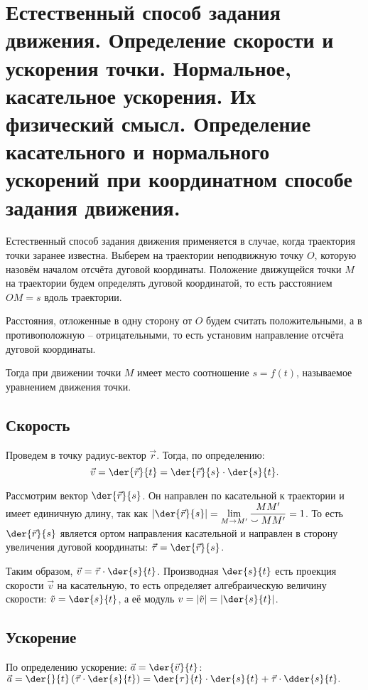 \chapter{Естественный способ задания движения. Определение скорости и ускорения
точки. Нормальное, касательное ускорения. Их физический смысл. Определение
касательного и нормального ускорений при координатном способе задания движения.}

Естественный способ задания движения применяется в случае, когда траектория
точки заранее известна. Выберем на траектории неподвижную точку \( O \), которую
назовём началом отсчёта дуговой координаты. Положение движущейся точки \( M \)
на траектории будем определять дуговой координатой, то есть расстоянием
\( OM = s \) вдоль траектории.

Расстояния, отложенные в одну сторону от \( O \) будем считать положительными, а
в противоположную -- отрицательными, то есть установим направление отсчёта
дуговой координаты.

Тогда при движении точки \( M \) имеет место соотношение \( s = f(t) \),
называемое уравнением движения точки.

\section{Скорость}

Проведем в точку радиус-вектор \( \vec{r} \). Тогда, по определению:
\[
    \vec{v} = \der{\vec{r}}{t} = \der{\vec{r}}{s}\cdot\der{s}{t}.
\]

Рассмотрим вектор \( \ds \der{\vec{r}}{s} \). Он направлен по касательной к
траектории и имеет единичную длину, так как \( \ds \left|\der{\vec{r}}{s}\right|
= \lim_{M\to M'}\frac{MM'}{\smallsmile MM'} = 1 \). То есть \( \ds
\der{\vec{r}}{s} \) является ортом направления касательной и направлен в сторону
увеличения дуговой координаты: \( \ds \vec{\tau} = \der{\vec{r}}{s} \).

Таким образом, \( \ds \vec{v} = \vec{\tau}\cdot\der{s}{t} \). Производная
\( \ds \der{s}{t} \) есть проекция скорости \( \vec{v} \) на касательную, то
есть определяет алгебраическую величину скорости: \( \ds \tilde{v} =
\der{s}{t} \), а её модуль \( \ds v = |\tilde{v}| = \left|\der{s}{t}\right| \).

\section{Ускорение}

По определению ускорение: \( \ds \vec{a} = \der{\vec{v}}{t} \):
\( \ds
    \vec{a} = \der{}{t}\left(\vec{\tau}\cdot\der{s}{t}\right) = \der{\tau}{t}
    \cdot\der{s}{t} + \vec{\tau}\cdot\dder{s}{t}.
\)


